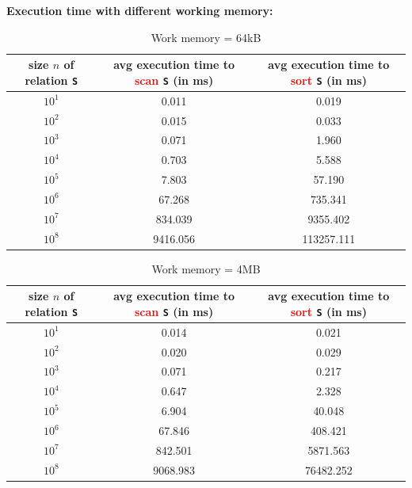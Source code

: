 \documentclass[10pt]{article}
\begin{document}
\textbf{Execution time with different working memory:}
\begin{table}[H]
\begin{center}
\begin{tabular}{c|c|c}
size $n$ of relation {\tt S} & avg execution time to \textcolor{red}{scan} {\tt S} (in ms) &avg execution time to \textcolor{red}{sort} {\tt S} (in ms) \\ \hline
$10^1$&  0.011 &  0.019\\
$10^2$&  0.015 &  0.033\\
$10^3$&  0.071 &  1.960\\
$10^4$&  0.703 &  5.588\\
$10^5$&  7.803 & 57.190\\
$10^6$& 67.268 &735.341\\
$10^7$&834.039 &9355.402\\
$10^8$&9416.056&113257.111\\
\end{tabular}
\caption{Work memory = 64kB}
\end{center}
\end{table}

\begin{table}[H]
\begin{center}
\begin{tabular}{c|c|c}
size $n$ of relation {\tt S} & avg execution time to \textcolor{red}{scan} {\tt S} (in ms) &avg execution time to \textcolor{red}{sort} {\tt S} (in ms) \\ \hline
$10^1$&  0.014 &  0.021\\
$10^2$&  0.020 &  0.029\\
$10^3$&  0.071 &  0.217\\
$10^4$&  0.647 &  2.328\\
$10^5$&  6.904 & 40.048\\
$10^6$& 67.846 &408.421\\
$10^7$&842.501 &5871.563\\
$10^8$&9068.983&76482.252\\
\end{tabular}
\caption{Work memory = 4MB}
\end{center}
\end{table}
\end{document}
